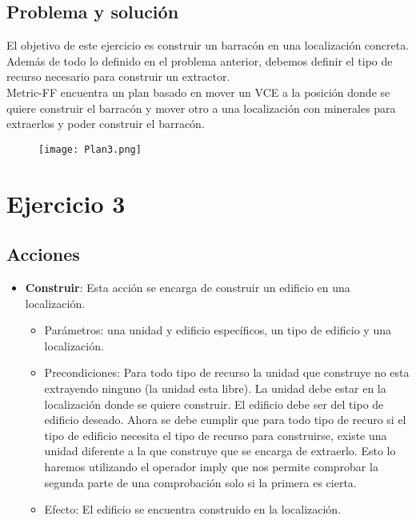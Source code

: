 \subsection{Problema y solución}
El objetivo de este ejercicio es construir un barracón en una localización concreta.\\
Además de todo lo definido en el problema anterior, debemos definir el tipo de recurso necesario para construir un extractor.\\
Metric-FF encuentra un plan basado en mover un VCE a la posición donde se quiere construir el barracón y mover otro a una localización con minerales para extraerlos y poder construir el barracón.
\begin{figure}[H]
   \centering
   \texttt{[image: Plan3.png]}
\end{figure}

\section{Ejercicio 3}
\subsection{Acciones}
\begin{itemize}
   \item \textbf{Construir}: Esta acción se encarga de construir un edificio en una localización.
   \begin{itemize}
      \item Parámetros: una unidad y edificio específicos, un tipo de edificio y una localización.
      \item Precondiciones: Para todo tipo de recurso la unidad que construye no esta extrayendo ninguno (la unidad esta libre). La unidad debe estar en la localización donde se quiere construir. El edificio debe ser del tipo de edificio deseado. Ahora se debe cumplir que para todo tipo de recuro si el tipo de edificio necesita el tipo de recurso para construirse, existe una unidad diferente a la que construye que se encarga de extraerlo. Esto lo haremos utilizando el operador imply que nos permite comprobar la segunda parte de una comprobación solo si la primera es cierta.
      \item Efecto: El edificio se encuentra construido en la localización.
   \end{itemize}
\end{itemize}
